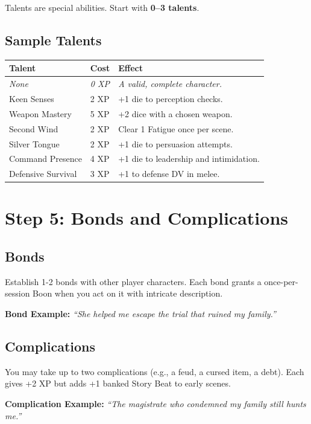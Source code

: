\documentclass[11pt]{book}
\begin{document}
Talents are special abilities. Start with \textbf{0--3 talents}.

\subsection*{Sample Talents}

\begin{center}
\begin{tabular}{lll}
\toprule
\textbf{Talent} & \textbf{Cost} & \textbf{Effect} \\
\midrule
\textit{None} & \textit{0 XP} & \textit{A valid, complete character.} \\
Keen Senses & 2 XP & +1 die to perception checks. \\
Weapon Mastery & 5 XP & +2 dice with a chosen weapon. \\
Second Wind & 2 XP & Clear 1 Fatigue once per scene. \\
Silver Tongue & 2 XP & +1 die to persuasion attempts. \\
Command Presence & 4 XP & +1 die to leadership and intimidation. \\
Defensive Survival & 3 XP & +1 to defense DV in melee. \\
\bottomrule
\end{tabular}
\end{center}

\section{Step 5: Bonds and Complications}

\subsection*{Bonds}
Establish 1-2 bonds with other player characters. Each bond grants a once-per-session Boon when you act on it with intricate description.

\textbf{Bond Example:} \textit{``She helped me escape the trial that ruined my family.''}

\subsection*{Complications}
You may take up to two complications (e.g., a feud, a cursed item, a debt). Each gives +2 XP but adds +1 banked Story Beat to early scenes.

\textbf{Complication Example:} \textit{``The magistrate who condemned my family still hunts me.''}
\end{document}
